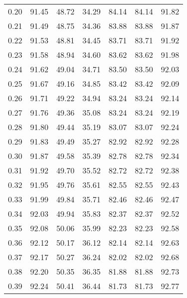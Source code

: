 \begin{tabular}{|c|c|c|c|c|c|c|}
      0.20 &     91.45 &     48.72 &      34.29 &   84.14 &      84.14 &         91.82 \\
      0.21 &     91.49 &     48.75 &      34.36 &   83.88 &      83.88 &         91.87 \\
      0.22 &     91.53 &     48.81 &      34.45 &   83.71 &      83.71 &         91.92 \\
      0.23 &     91.58 &     48.94 &      34.60 &   83.62 &      83.62 &         91.98 \\
      0.24 &     91.62 &     49.04 &      34.71 &   83.50 &      83.50 &         92.03 \\
      0.25 &     91.67 &     49.16 &      34.85 &   83.42 &      83.42 &         92.09 \\
      0.26 &     91.71 &     49.22 &      34.94 &   83.24 &      83.24 &         92.14 \\
      0.27 &     91.76 &     49.36 &      35.08 &   83.24 &      83.24 &         92.19 \\
      0.28 &     91.80 &     49.44 &      35.19 &   83.07 &      83.07 &         92.24 \\
      0.29 &     91.83 &     49.49 &      35.27 &   82.92 &      82.92 &         92.28 \\
      0.30 &     91.87 &     49.58 &      35.39 &   82.78 &      82.78 &         92.34 \\
      0.31 &     91.92 &     49.70 &      35.52 &   82.72 &      82.72 &         92.38 \\
      0.32 &     91.95 &     49.76 &      35.61 &   82.55 &      82.55 &         92.43 \\
      0.33 &     91.99 &     49.84 &      35.71 &   82.46 &      82.46 &         92.47 \\
      0.34 &     92.03 &     49.94 &      35.83 &   82.37 &      82.37 &         92.52 \\
      0.35 &     92.08 &     50.06 &      35.99 &   82.23 &      82.23 &         92.58 \\
      0.36 &     92.12 &     50.17 &      36.12 &   82.14 &      82.14 &         92.63 \\
      0.37 &     92.17 &     50.27 &      36.24 &   82.02 &      82.02 &         92.68 \\
      0.38 &     92.20 &     50.35 &      36.35 &   81.88 &      81.88 &         92.73 \\
      0.39 &     92.24 &     50.41 &      36.44 &   81.73 &      81.73 &         92.77 \\

\end{tabular}
